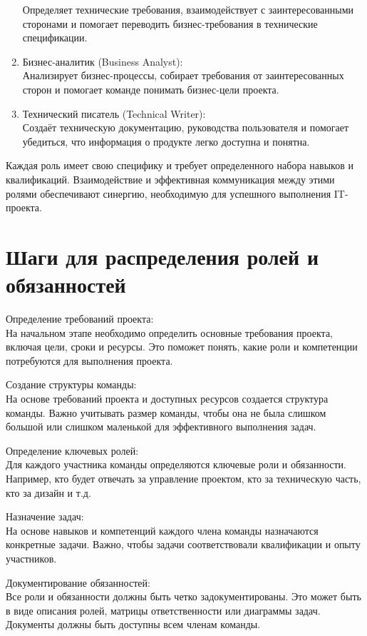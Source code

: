 \begin{enumerate}
            Определяет технические требования, взаимодействует с заинтересованными сторонами и помогает переводить бизнес-требования в технические спецификации.
        \item Бизнес-аналитик (Business Analyst): \\
            Анализирует бизнес-процессы, собирает требования от заинтересованных сторон и помогает команде понимать бизнес-цели проекта.
        \item Технический писатель (Technical Writer): \\ 
            Создаёт техническую документацию, руководства пользователя и помогает убедиться, что информация о продукте легко доступна и понятна.
    \end{enumerate}

    Каждая роль имеет свою специфику и требует определенного набора навыков и квалификаций. Взаимодействие и эффективная коммуникация между этими ролями обеспечивают синергию, необходимую для успешного выполнения IT-проекта.

    \section{Шаги для распределения ролей и обязанностей}
    Определение требований проекта: \\
    На начальном этапе необходимо определить основные требования проекта, включая цели, сроки и ресурсы. Это поможет понять, какие роли и компетенции потребуются для выполнения проекта.
    
    Создание структуры команды: \\
    На основе требований проекта и доступных ресурсов создается структура команды. Важно учитывать размер команды, чтобы она не была слишком большой или слишком маленькой для эффективного выполнения задач.
    
    Определение ключевых ролей: \\
    Для каждого участника команды определяются ключевые роли и обязанности. Например, кто будет отвечать за управление проектом, кто за техническую часть, кто за дизайн и т.д.
    
    Назначение задач: \\
    На основе навыков и компетенций каждого члена команды назначаются конкретные задачи. Важно, чтобы задачи соответствовали квалификации и опыту участников.
    
    Документирование обязанностей: \\
    Все роли и обязанности должны быть четко задокументированы. Это может быть в виде описания ролей, матрицы ответственности или диаграммы задач. Документы должны быть доступны всем членам команды.
    
